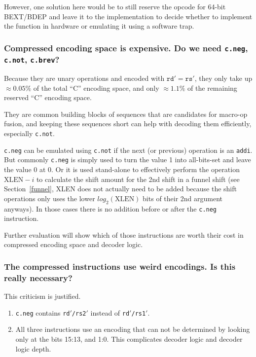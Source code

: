 However, one solution here would be to still reserve the opcode for 64-bit
BEXT/BDEP and leave it to the implementation to decide whether to implement the
function in hardware or emulating it using a software trap.

\subsubsection{Compressed encoding space is expensive. Do we need {\tt c.neg}, {\tt c.not}, {\tt c.brev}?}

Because they are unary operations and encoded with $\texttt{rd}' = \texttt{rs}'$, they only take
up $\approx 0.05\%$ of the total ``C'' encoding space, and only $\approx 1.1\%$
of the remaining reserved ``C'' encoding space.

They are common building blocks of sequences that are candidates for macro-op fusion,
and keeping these sequences short can help with decoding them efficiently, especially
{\tt c.not}.

{\tt c.neg} can be emulated using {\tt c.not} if the next (or previous) operation
is an {\tt addi}. But commonly {\tt c.neg} is simply used to turn the value 1
into all-bits-set and leave the value 0 at 0. Or it is used stand-alone to
effectively perform the operation $\textrm{XLEN}-i$ to calculate the shift
amount for the 2nd shift in a funnel shift (see Section~\ref{funnel}, XLEN does
not actually need to be added because the shift operations only uses the lower
$log_2(\textrm{XLEN})$ bits of their 2nd argument anyways). In those cases
there is no addition before or after the {\tt c.neg} instruction.

Further evaluation will show which of those instructions are worth their cost
in compressed encoding space and decoder logic.

\subsubsection{The compressed instructions use weird encodings. Is this really necessary?}

This criticism is justified.

\begin{enumerate}
\item {\tt c.neg} contains {\tt rd$'$/rs2$'$} instead of {\tt rd$'$/rs1$'$}.

\item All three instructions use an encoding that can not be determined by looking
only at the bits 15:13, and 1:0. This complicates decoder logic and decoder
logic depth.
\end{enumerate}

